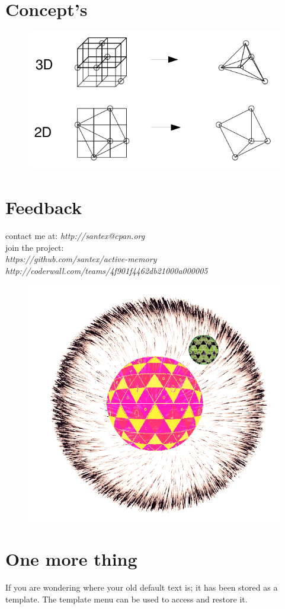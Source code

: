 \documentclass[11pt]{article}
\begin{document}
\section{Concept's}
\begin{figure}[htp]
\centering
\includegraphics[scale=0.65]{image/research-base-002.png}
\caption{}
\label{}
\end{figure}



\section{Feedback}
contact me at: \emph{http://santex@cpan.org}
\\
join the project:\\
\emph{https://github.com/santex/active-memory} 
\\
\emph{http://coderwall.com/teams/4f901f4462db21000a000005}


\begin{figure}[htp]
\centering
\includegraphics[scale=0.29]{./image/artee-symbiosis.png}
\caption{}
\label{}
\end{figure}


\section{One more thing}
If you are wondering where your old default text is; it has been stored as a template. The template menu can be used to access and restore it. 
\end{document}
